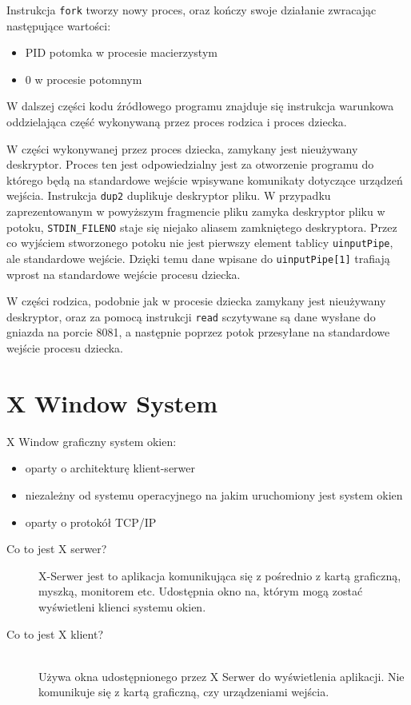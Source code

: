 \begin{appendices}
Instrukcja \lstinline|fork| tworzy nowy proces, oraz kończy swoje działanie zwracając następujące wartości:

\begin{itemize}
	\item PID potomka w procesie macierzystym
	\item 0 w procesie potomnym
\end{itemize}

W dalszej części kodu źródłowego programu znajduje się instrukcja warunkowa oddzielająca część wykonywaną przez proces rodzica i proces dziecka. 

W części wykonywanej przez proces dziecka, zamykany jest nieużywany deskryptor. Proces ten jest odpowiedzialny jest za otworzenie programu do którego będą na standardowe wejście wpisywane komunikaty dotyczące urządzeń wejścia. Instrukcja \lstinline{dup2} duplikuje deskryptor pliku. W przypadku zaprezentowanym w powyższym fragmencie pliku zamyka deskryptor pliku w potoku, \lstinline{STDIN_FILENO} staje się niejako aliasem zamkniętego deskryptora. Przez co wyjściem stworzonego potoku nie jest pierwszy element tablicy \lstinline{uinputPipe}, ale standardowe wejście. Dzięki temu dane wpisane do \lstinline{uinputPipe[1]} trafiają wprost na standardowe wejście procesu dziecka.

W części rodzica, podobnie jak w procesie dziecka zamykany jest nieużywany deskryptor, oraz za pomocą instrukcji \lstinline{read} sczytywane są dane wysłane do gniazda na porcie 8081, a następnie poprzez potok przesyłane na standardowe wejście procesu dziecka.

\newpage
\section{X Window System}
\label{app:X Window System}
X Window graficzny system okien:
\begin{itemize}
	\item oparty o architekturę klient-serwer
	\item niezależny od systemu operacyjnego na jakim uruchomiony jest system okien
	\item oparty o protokół TCP/IP
\end{itemize}

\begin{description}
	\item[Co to jest X serwer?] \hfill \par
		X-Serwer jest to aplikacja komunikująca się z pośrednio z kartą graficzną, myszką, monitorem etc. Udostępnia okno na, którym mogą zostać wyświetleni klienci systemu okien.
	\item[Co to jest X klient?] \hfill \\
Używa okna udostępnionego przez X Serwer do wyświetlenia aplikacji. Nie komunikuje się z kartą graficzną, czy urządzeniami wejścia.


\end{description}
\end{appendices}

